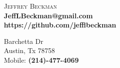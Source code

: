 \documentclass[a4paper,11pt]{article}
\begin{document}
\begin{minipage}[t]{7cm}
\begin{flushleft}
\textsc{Jeffrey Beckman} \\
\indent\textbf{JeffLBeckman@gmail.com} \\
\indent\textbf{https://github.com/jefflbeckman}\\
\end{flushleft}
\end{minipage}
\hfill
\begin{minipage}[t]{7cm}
\begin{flushright}
 Barchetta Dr\\
\indent Austin, Tx 78758 \\
\indent Mobile: \textbf{(214)-477-4069}
\end{flushright}
\end{minipage}
\end{document}
